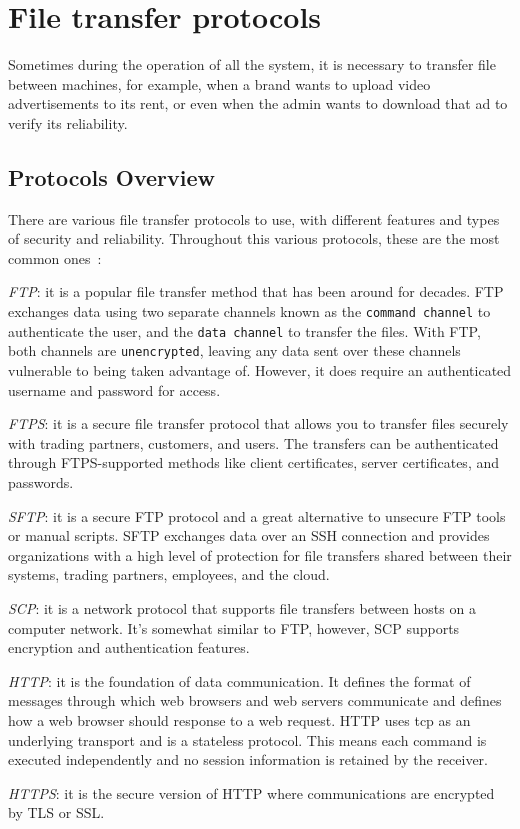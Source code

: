 %
\section{File transfer protocols}
\label{sec:file-transf-prot}
Sometimes during the operation of all the system, it is necessary to transfer file between machines, for example, when a brand wants to upload video advertisements to its rent, or even when the admin wants to download that ad to verify its reliability.

\subsection{Protocols Overview}
\label{sub-sec:prot-overview}

There are various file transfer protocols to use, with different features and types of security and reliability. Throughout this various protocols, these are the most common ones~\cite{file-transf-protoc}:
%
\begin{item-c}
\item \emph{FTP}: it is a popular file transfer method that has been around for decades. FTP exchanges data using two separate channels known as the \texttt{command channel} to authenticate the user, and the \texttt{data channel} to transfer the files.
With FTP, both channels are \texttt{unencrypted}, leaving any data sent over these channels vulnerable to being taken advantage of. However, it does require an authenticated username and password for access.
%
\item \emph{FTPS}: it is a secure file transfer protocol that allows you to transfer files securely with trading partners, customers, and users. The transfers can be authenticated through FTPS-supported methods like client certificates, server certificates, and passwords.
%
\item \emph{SFTP}: it is a secure FTP protocol and a great alternative to unsecure FTP tools or manual scripts. SFTP exchanges data over an SSH connection and provides organizations with a high level of protection for file transfers shared between their systems, trading partners, employees, and the cloud.
%
\item \emph{SCP}: it is a network protocol that supports file transfers between hosts on a computer network. It's somewhat similar to FTP, however, SCP supports encryption and authentication features.
%
\item \emph{HTTP}: it is the foundation of data communication. It defines the format of messages through which web browsers and web servers communicate and defines how a web browser should response to a web request. HTTP uses \gls{tcp} as an underlying transport and is a stateless protocol. This means each command is executed independently and no session information is retained by the receiver.
%
\item \emph{HTTPS}: it is the secure version of HTTP where communications are encrypted by TLS or SSL.
\end{item-c}

